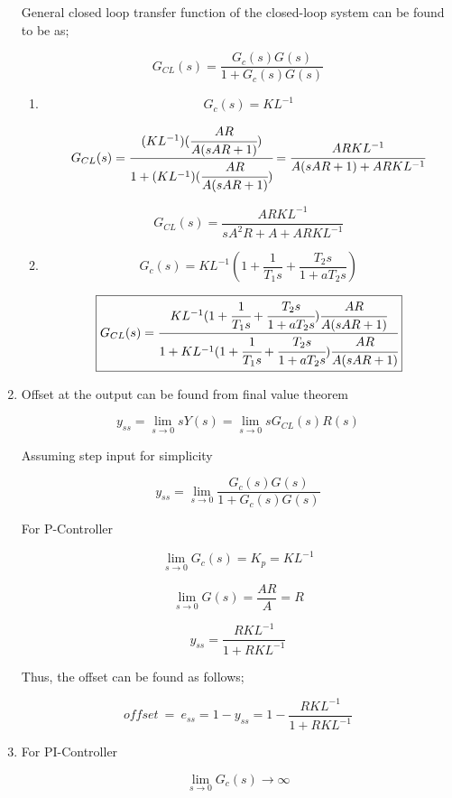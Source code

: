 \documentclass[a4paper,12pt]{article}
\begin{document}
\begin{enumerate}
		
			General closed loop transfer function of the closed-loop system can be found to be as;
			
			$$G_{CL}(s)=\frac{G_c(s)G(s)}{1+G_c(s)G(s)}$$
			\begin{enumerate}
				
			
				
				\item 
				
					$$ G_c(s)= KL^{-1} $$
					
					$$ G_{CL}(s)=\cfrac{(KL^{-1})(\cfrac{AR}{A(sAR+1)})}{1+(KL^{-1})(\cfrac{AR}{A(sAR+1)})} = \cfrac{ARKL^{-1}}{A(sAR+1)+ARKL^{-1}}$$
					
					$$\boxed{ 	G_{CL}(s)= \frac{ARKL^{-1}}{sA^2R+A+ARKL^{-1}} }$$ 
					
					
						
				
				\item 
				
					$$ G_c(s)= KL^{-1}(1+\frac{1}{T_1s}+\frac{T_2s}{1+aT_2s})$$
					
					$$\boxed{ G_{CL}(s)=\cfrac{KL^{-1}(1+\cfrac{1}{T_1s}+\cfrac{T_2s}{1+aT_2s})\cfrac{AR}{A(sAR+1)}}{1+KL^{-1}(1+\cfrac{1}{T_1s}+\cfrac{T_2s}{1+aT_2s})\cfrac{AR}{A(sAR+1)}} }$$
					
					
			\end{enumerate}
		
		
		\item Offset at the output can be found from final value theorem
			
			$$ y_{ss}=\lim_{s \to 0}sY(s) = \lim_{s \to 0}sG_{CL}(s)R(s)$$
			
			Assuming step input for simplicity
			
			$$ y_{ss} = \lim_{s \to 0} \frac{G_c(s)G(s)}{1+G_c(s)G(s)}$$
			
			For P-Controller
			
				$$ 	\lim_{s \to 0} G_c(s)=K_p=KL^{-1} $$			
				
				$$ \lim_{s \to 0} G(s)=\frac{AR}{A}=R $$
				
				$$ y_{ss}= \frac{RKL^{-1}}{1+RKL^{-1}} $$
					
				Thus, the offset can be found as follows;
				
				$$\boxed{ offset\ =\ e_{ss}= 1-y_{ss}=1- \frac{RKL^{-1}}{1+RKL^{-1}} }$$
				
		\item For PI-Controller
			
			$$ 	\lim_{s \to 0} G_c(s) \to \infty $$			
				

\end{enumerate}
\end{document}
